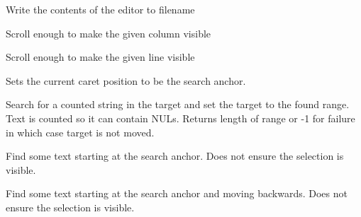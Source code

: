 \label{wxstyledtextctrlsavefile}


Write the contents of the editor to filename


\label{wxstyledtextctrlscrolltocolumn}


Scroll enough to make the given column visible


\label{wxstyledtextctrlscrolltoline}


Scroll enough to make the given line visible


\label{wxstyledtextctrlsearchanchor}


Sets the current caret position to be the search anchor.


\label{wxstyledtextctrlsearchintarget}


Search for a counted string in the target and set the target to the found
range. Text is counted so it can contain NULs.
Returns length of range or -1 for failure in which case target is not moved.


\label{wxstyledtextctrlsearchnext}


Find some text starting at the search anchor.
Does not ensure the selection is visible.


\label{wxstyledtextctrlsearchprev}


Find some text starting at the search anchor and moving backwards.
Does not ensure the selection is visible.


\label{wxstyledtextctrlselectall}


